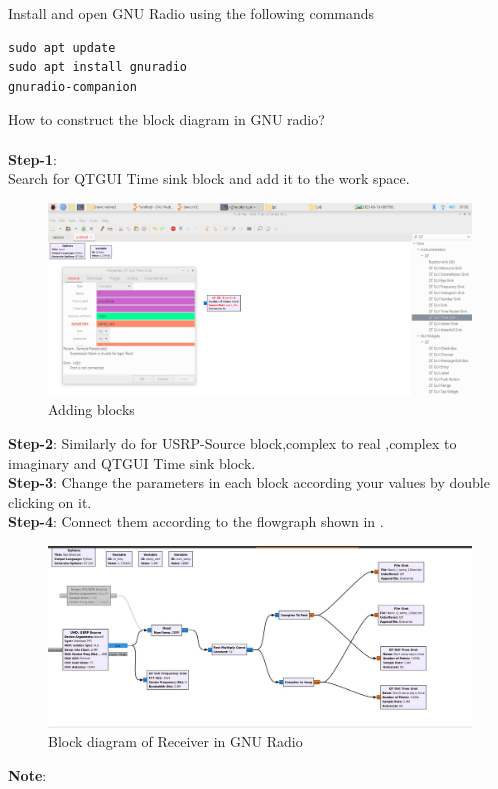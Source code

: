  Install and open GNU Radio using the following commands
\\
\begin{lstlisting}
sudo apt update
sudo apt install gnuradio
gnuradio-companion
\end{lstlisting}
 How to construct the block diagram in GNU radio? \\
	\solution  \\
\textbf{Step-1}:\\
Search for QTGUI Time sink  block and add it to the work space.
\begin{figure}[H]
\centering
\includegraphics[width=\columnwidth]{figs/add.png}
\caption{Adding blocks}
\label{fig:add blocks}
\end{figure}
\textbf{Step-2}:
Similarly do for USRP-Source block,complex to real ,complex to imaginary and QTGUI Time sink block.
\\
\textbf{Step-3}:
Change the parameters in each block according your values by double clicking on it.
\\
\textbf{Step-4}:
Connect them according to the flowgraph shown in .
\begin{figure}[H]
\centering
\includegraphics[width=\columnwidth]{figs/USRP_navic.jpg}
\caption{Block diagram of Receiver in GNU Radio}
\label{fig:Rx_Block_diagram}
\end{figure}
\textbf{Note}:
